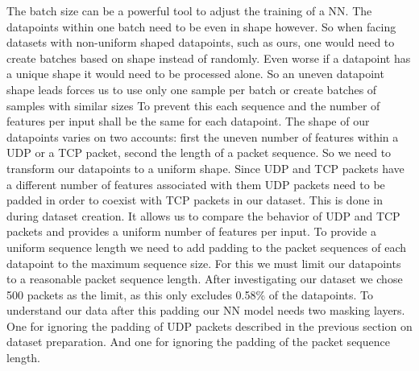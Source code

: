 \documentclass[
	ngerman,
	ruledheaders=section,%
	class=report,%
	thesis={type=bachelor},%
	accentcolor=9c,%
	custommargins=true,%
	marginpar=false,%
	parskip=half-,%
	fontsize=11pt,%
	twoside
]{tudapub}
\begin{document}
The batch size can be a powerful tool to adjust the training of a NN.
The datapoints within one batch need to be even in shape however.
So when facing datasets with non-uniform shaped datapoints, such as ours, one would need to create batches based on shape instead of randomly.
Even worse if a datapoint has a unique shape it would need to be processed alone.
So an uneven datapoint shape leads forces us to use only one sample per batch or create batches of samples with similar sizes
To prevent this each sequence and the number of features per input shall be the same for each datapoint.
The shape of our datapoints varies on two accounts: first the uneven number of features within a UDP or a TCP packet, second the length of a packet sequence.
So we need to transform our datapoints to a uniform shape.
Since UDP and TCP packets have a different number of features associated with them UDP packets need to be padded in order to coexist with TCP packets in our dataset.
This is done in during dataset creation.
It allows us to compare the behavior of UDP and TCP packets and provides a uniform number of features per input.
To provide a uniform sequence length we need to add padding to the packet sequences of each datapoint to the maximum sequence size.
For this we must limit our datapoints to a reasonable packet sequence length.
After investigating our dataset we chose 500 packets as the limit, as this only excludes 0.58\% of the datapoints.
To understand our data after this padding our NN model needs two masking layers.
One for ignoring the padding of UDP packets described in the previous section on dataset preparation.
And one for ignoring the padding of the packet sequence length.



\end{document}
